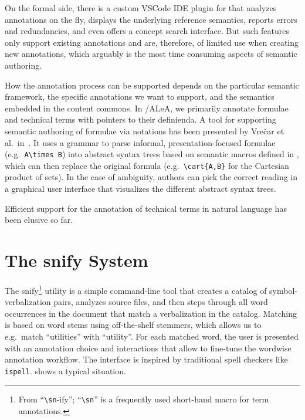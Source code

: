 \documentclass[runningheads]{llncs}
\newcommand\ALeA{\textsf{ALeA}\xspace}
\newcommand\snify{\textsf{snify}\xspace}
\begin{document}
On the formal side, there is a custom VSCode IDE plugin for \sTeX \cite{sTeX-IDE:git} that analyzes
annotations on the fly, displays the underlying reference semantics, reports errors and
redundancies, and even offers a concept search interface.
But such features only support
existing annotations and are, therefore, of limited use when creating new annotations,
which arguably is the most time consuming aspects of semantic authoring.

How the annotation process can be supported depends on the particular semantic framework,
the specific annotations we want to support, and the semantics embedded in the content
commons.  In \sTeX/\ALeA, we primarily annotate formulae and technical terms with pointers
to their definienda.  A tool for supporting semantic authoring of formulae via notations
has been presented by Vre{\v{c}}ar et al.\ in~\cite{VreWelKam:tsmmdui24}.  It uses a
grammar to parse informal, presentation-focused formulae (e.g.\
\lstinline[keywordstyle={}]|A\times B|) into abstract syntax trees based on semantic
macros defined in \sTeX, which can then replace the original formula (e.g.\
\lstinline|\cart{A,B}| for the Cartesian product of sets).  In the case of ambiguity,
authors can pick the correct reading in a graphical user interface that visualizes the
different abstract syntax trees.

Efficient support for the annotation of technical terms in natural language
has been elusive so far.


\section{The \snify System}\label{sec:snify}
The \snify\footnote{
From ``\texttt{\textbackslash sn}-ify''; ``\texttt{\textbackslash sn}'' is
a frequently used \sTeX short-hand macro for term annotations.}
utility \cite{stextools:git}
is a simple command-line tool that creates a catalog of
symbol-verbalization pairs, analyzes \sTeX source files, and then steps through all word
occurrences in the document that match a verbalization in the catalog.  Matching is based
on word stems using off-the-shelf stemmers, which allows us to e.g.\ match ``utilities''
with ``utility''.  For each matched word, the user is presented with an annotation choice
and interactions that allow to fine-tune the wordwise annotation
workflow.
The interface is inspired by traditional spell checkers like \lstinline|ispell|.
 shows a typical situation.
\end{document}
